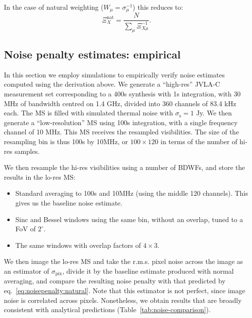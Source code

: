 \documentclass[useAMS,usenatbib]{mn2e}
\newcommand{\OMS}[1]{\textcolor{red}{{\bf OMS: #1}}}
\begin{document}
In the case of natural weighting ($W_\mu=\sigma_\mu^{-1}$) this reduces to:
\begin{equation}
\label{eq:noisepenalty:natural}
\Xi_X^{\mathrm{nat}} = \frac{N}{ \sum_{\mu} \Xi_{X\mu}^{-1} }.
\end{equation}


\subsection{Noise penalty estimates: empirical}

\label{subsec:noise}
In this section we employ simulations to empirically verify noise estimates computed using the derivation 
above. We generate a ``high-res''
JVLA-C measurement set corresponding to a 400s synthesis with 1s integration, with 30 MHz of bandwidth
centred on 1.4 GHz, divided into 360 channels of 83.4 kHz each. The MS is filled with simulated thermal noise 
with $\sigma_\mathrm{s}=1$ Jy. We then generate a ``low-resolution'' MS using 100s integration, with 
a single frequency channel of 10 MHz. This MS receives the resampled visibilities. 
The size of the resampling bin is thus 100s by 10MHz, or $100\times120$ in terms of the number of hi-res samples.

We then resample the hi-res visibilities using a number of BDWFs, and store the results in the lo-res MS:

\begin{itemize}
\item Standard averaging to 100s and 10MHz (using the middle 120 channels). This gives us the baseline noise
estimate.
\item Sinc and Bessel windows using the same bin, without an overlap, tuned to a FoV of $2^\circ$.
\item The same windows with overlap factors of $4\times3$.
\end{itemize}

We then image the lo-res MS and take the r.m.s. pixel noise across the image as an estimator of $\sigma_\mathrm{pix}$,
divide it by the baseline estimate produced with normal averaging, and compare the resulting noise penalty with that
predicted by eq.~\ref{eq:noisepenalty:natural}. Note that this estimator is not perfect, since image noise is correlated
across pixels. Nonetheless, we obtain results that are broadly consistent with analytical predictions 
(Table~\ref{tab:noise-comparison}).
\end{document}

